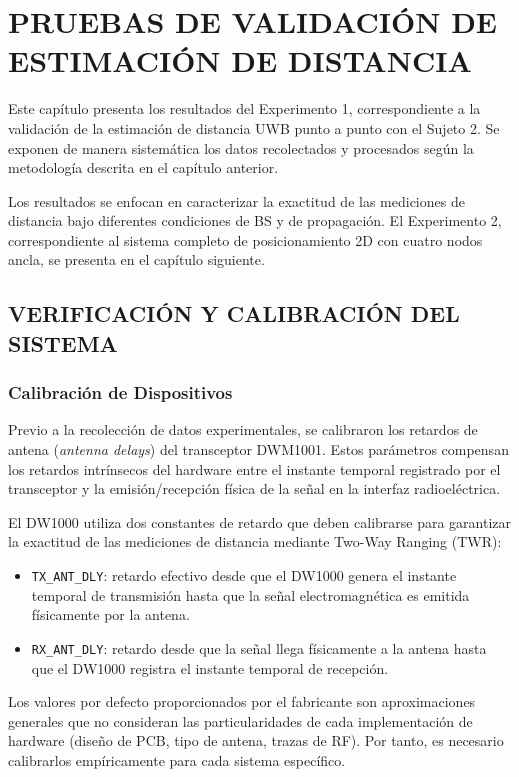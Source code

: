 \chapter{PRUEBAS DE VALIDACIÓN DE ESTIMACIÓN DE DISTANCIA}
\label{ch:resultados}

Este capítulo presenta los resultados del Experimento 1, correspondiente a la validación de la estimación de distancia UWB punto a punto con el Sujeto 2. Se exponen de manera sistemática los datos recolectados y procesados según la metodología descrita en el capítulo anterior.

Los resultados se enfocan en caracterizar la exactitud de las mediciones de distancia bajo diferentes condiciones de BS y de propagación. El Experimento 2, correspondiente al sistema completo de posicionamiento 2D con cuatro nodos ancla, se presenta en el capítulo siguiente.

\section{VERIFICACIÓN Y CALIBRACIÓN DEL SISTEMA}
\label{sec:verificacion_sistema}

\subsection{Calibración de Dispositivos}

Previo a la recolección de datos experimentales, se calibraron los retardos de antena (\textit{antenna delays}) del transceptor DWM1001. Estos parámetros compensan los retardos intrínsecos del hardware entre el instante temporal registrado por el transceptor y la emisión/recepción física de la señal en la interfaz radioeléctrica.

El DW1000 utiliza dos constantes de retardo que deben calibrarse para garantizar la exactitud de las mediciones de distancia mediante Two-Way Ranging (TWR):
%
\begin{itemize}
\item \texttt{TX\_ANT\_DLY}: retardo efectivo desde que el DW1000 genera el instante temporal de transmisión hasta que la señal electromagnética es emitida físicamente por la antena. 
\item \texttt{RX\_ANT\_DLY}: retardo desde que la señal llega físicamente a la antena hasta que el DW1000 registra el instante temporal de recepción.
\end{itemize}

Los valores por defecto proporcionados por el fabricante son aproximaciones generales que no consideran las particularidades de cada implementación de hardware (diseño de PCB, tipo de antena, trazas de RF). Por tanto, es necesario calibrarlos empíricamente para cada sistema específico.

